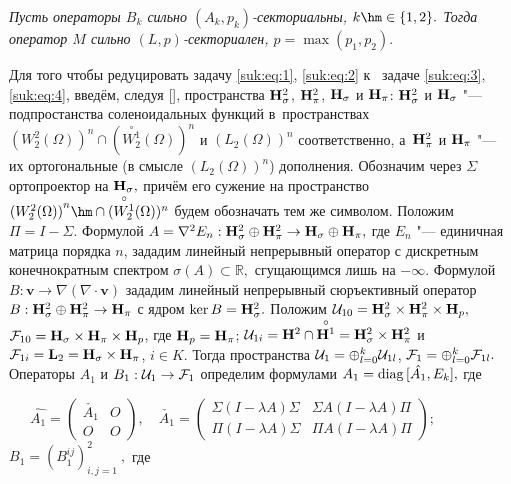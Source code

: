 \begin{theorem}[3] %
{\it Пусть операторы $B_k$ сильно $(A_k,p_k)$-секториальны, $k\hm \in \{1, 2\}.$ 
Тогда оператор $M$ сильно $(L,p)$-секториален, $p=\max(p_1, p_2).$}
\end{theorem}

\smallskip
{}
Для  того  чтобы редуцировать задачу \eqref{suk:eq:1}, \eqref{suk:eq:2} к~ задаче \eqref{suk:eq:3}, \eqref{suk:eq:4},   введём,  следуя  [], пространства ${\bf H}_{\sigma}^2$, ${\bf H}_{\pi}^2$, ${\bf H}_{\sigma}$  и ${\bf H}_{\pi}$:
${\bf H}_{\sigma}^2$ и ${\bf H}_{\sigma}$  "---    подпростанства соленоидальных   функций   в~пространствах ${(W_2^2(\Omega))}^n \cap ({\stackrel{\circ}{W_2^1}} (\Omega)) ^n$ и ${(L_2(\Omega))}^n$ соответственно, а~${\bf H}_{\pi}^2$ и ${\bf H}_{\pi}$  "---   их ортогональные (в смысле ${(L_2(\Omega))}^n$)
дополнения. 
Обозначим  через  $\Sigma$  ортопроектор на ${\bf H}_{\sigma},$ причём  его  сужение  на  пространство ${(W_2^2(\Omega))}^n \hm \cap ({\stackrel{\circ}{W_2^1}} (\Omega)) ^n$ будем обозначать  тем  же символом. 
Положим $\Pi=I- \Sigma .$
Формулой $A={\nabla}^2E_n : {\bf H}_{\sigma}^2 \oplus {\bf H}_{\pi}^2 \to {\bf H}_{\sigma} \oplus {\bf H}_{\pi},$
где  $E_n$  "---   единичная матрица порядка $n$, зададим линейный  непрерывный  оператор с  дискретным конечнократным спектром $\sigma (A) \subset {\mathbb R},$ сгущающимся лишь на  $- \infty .$
Формулой  $B: \boldsymbol{v} \to \nabla(\nabla \cdot \boldsymbol{v})$  зададим линейный непрерывный сюръективный оператор $B: {\bf H}_{\sigma}^2 \oplus {\bf H}_{\pi}^2 \to {\bf H}_{\pi}$ с ядром $\ker B= {\bf H}_{\sigma}^2 .$ 
Положим ${\cal U}_{10}={\bf H}_{\sigma}^2 \times {\bf H}_{\pi}^2  \times {\bf H}_p,$
${\cal F}_{10}={\bf H}_{\sigma} \times   {\bf H}_{\pi}\times {\bf H}_p$, где ${\bf H}_p={\bf H}_{\pi}$;
${\cal U}_{1i}={\bf H}^2 \cap {{\stackrel{\circ}{{\bf H}^1}}} ={\bf H}_{\sigma}^2 \times {\bf H}_{\pi}^2$
и ${\cal F}_{1i}={\bf L}_2={\bf H}_{\sigma} \times   {\bf H}_{\pi}$, $i\in K $.
Тогда пространства ${\cal U}_1= \oplus_{l=0}^k  {\cal U}_{1l}$, ${\cal F}_1=\oplus_{l=0}^k  {\cal F}_{1l}.$
Операторы $A_1$ и $B_1:{\cal U}_1 \to {\cal F}_1$ определим формулами
$A_1={\rm diag}\,[{\hat {A_1}}, E_k],$ где

\begin{displaymath}
{\hat {A_1}}=
\left( \begin{array}{cc}
\check{A_1} & O\\
 O & O
\end{array} \right) ,\quad
\check{A_1}=
\left( \begin{array}{cc}
 \Sigma (I-\lambda A) \Sigma &  \Sigma A (I-\lambda A) \Pi \\
 \Pi (I-\lambda A) \Sigma &  \Pi A (I-\lambda A) \Pi
\end{array} \right) ; \qquad \qquad
\end{displaymath}
$B_1 ={( B_1^{ij})}_{i,j=1}^2~, $ где

